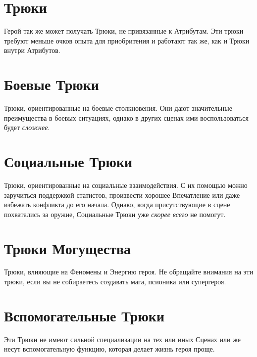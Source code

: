 \section{Трюки}
Герой так же может получать Трюки, не привязанные к Атрибутам. Эти трюки требуют меньше очков опыта для приобритения и работают так же, как и Трюки внутри Атрибутов.

\section{Боевые Трюки}
Трюки, ориентированные на боевые столкновения. Они дают значительные преимущества в боевых ситуациях, однако в других сценах ими воспользоваться будет \textit{сложнее}.

\section{Социальные Трюки}
Трюки, ориентированные на социальные взаимодействия. С их помощью можно заручиться поддержкой статистов, произвести хорошее Впечатление или даже избежать конфликта до его начала. Однако, когда присутствующие в сцене похватались за оружие, Социальные Трюки уже \textit{скорее всего} не помогут.

\section{Трюки Могущества}
Трюки, влияющие на Феномены и Энергию героя. Не обращайте внимания на эти трюки, если вы не собираетесь создавать мага, псионика или супергероя.

\section{Вспомогательные Трюки}
Эти Трюки не имеют сильной специализации на тех или иных Сценах или же несут вспомогательную функцию, которая делает жизнь героя проще.
